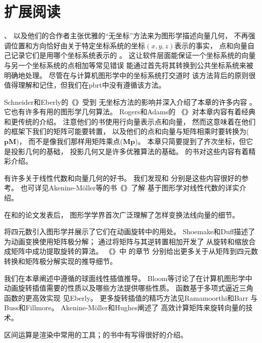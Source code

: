 \section{扩展阅读}\label{sec:扩展阅读02}
\citeauthor{10.1007/978-3-642-61542-9_19}、\citeauthor{10.1145/282957.282969}
以及他们的合作者主张优雅的“无坐标”方法来为图形学描述向量几何，
不再强调位置和方向恰好由关于特定坐标系统的坐标$(x,y,z)$表示的事实，
点和向量自己记录它们是用哪个坐标系统表示的
\citep{10.1145/282957.282969,10.1007/978-3-642-61542-9_19,Mann97acoordinate}。
这让软件层面能保证一个坐标系统的向量与另一个坐标系统的点相加等常见错误
能通过首先将其转换到公共坐标系统来被明确地处理。
尽管在与计算机图形学中的坐标系统打交道时
该方法背后的原则很值得理解和记住，但我们在pbrt中没有遵循该方法。

Schneider和Eberly的《》受到
无坐标方法的影响并深入介绍了本章的许多内容\citep{10.5555/2821579}
。
它也有许多有用的图形学几何算法。
Rogers和Adams\parencite*{10.5555/63448}的
《》对本章内容有着经典和更传统的介绍。
注意他们的书使用行向量表示点和向量，
然而这意味着在他们的框架下我们的矩阵可能要转置，
以及他们的点和向量与矩阵相乘时要转换为($\bm p\bm M$)，
而不是像我们那样用矩阵乘点($\bm M\bm p$)。
本章只简要提到了齐次坐标，但它是投影几何的基础，
投影几何又是许多优雅算法的基础。
\citeauthor{10.5555/113163}的书对这些内容有着精彩介绍\citep{10.5555/113163}。

有许多关于线性代数和向量几何的好书。
我们发现\citet{lang2012introduction}和\citet{buck1956advanced}
分别是这些内容很好的参考。
也可详见Akenine-Möller等的书《》\parencite*{10.5555/2829183}了解
基于图形学对线性代数的详实介绍。

在\citet{inproceedings}和\citet{TURKOWSKI1990539}的论文发表后，
图形学学界首次广泛理解了怎样变换法线向量的细节。

\citet{10.1145/325334.325242}将四元数引入图形学并展示了它们在动画旋转中的用处。
Shoemake和Duff\parencite*{10.5555/155294.155324}描述了为动画变换使用矩阵极分解；
\citet{doi:10.1137/0907079}通过将矩阵与其逆转置相加开发了
从旋转和缩放合成矩阵中成功提取旋转的算法。
《\emph{}》中
\citeauthor{SHOEMAKE1994207}的章节\parencite*{SHOEMAKE1991351,SHOEMAKE1994207,10.5555/180895.180914}
分别给出更多关于从矩阵到四元数转换和矩阵极分解实现的推导细节。

我们在本章阐述中遵循\citet{Blow_2004}的球面线性插值推导。
Bloom等\parencite*{Bloom2003ErrorsAO}讨论了在计算机图形学中
动画旋转插值需要的性质以及哪些方法提供哪些性质。
函数基于多项式逼近三角函数的更高效实现
见Eberly\parencite*{doi:10.1080/2151237X.2011.610255}。
更多旋转插值的精巧方法见Ramamoorthi和Barr\parencite*{10.1145/258734.258870}
与Buss和Fillmore\parencite*{10.1145/502122.502124}。
Akenine-Möller和Hughes\parencite*{doi:10.1080/10867651.1999.10487509}阐述了
高效计算矩阵来旋转向量的技术。

区间运算是渲染中常用的工具；\citet{moore1966interval}的书中有写得很好的介绍。